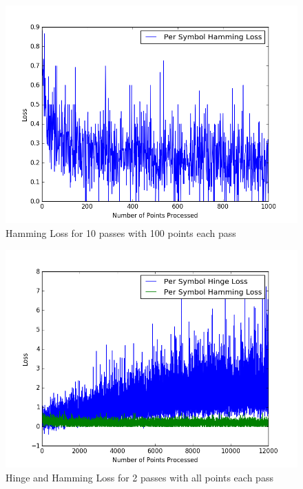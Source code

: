 \documentclass[twoside,11pt]{article}
\theoremstyle{definition}
\begin{document}
\begin{figure}[h]
\centering
\includegraphics[width=5in]{hammingLoss1.png}
\caption{Hamming Loss for 10 passes with 100 points each pass}
\end{figure}

\begin{figure}[h]
\centering
\includegraphics[width=5in]{hingeHammingLoss2.png}
\caption{Hinge and Hamming Loss for 2 passes with all points each pass}
\end{figure}
\end{document}
